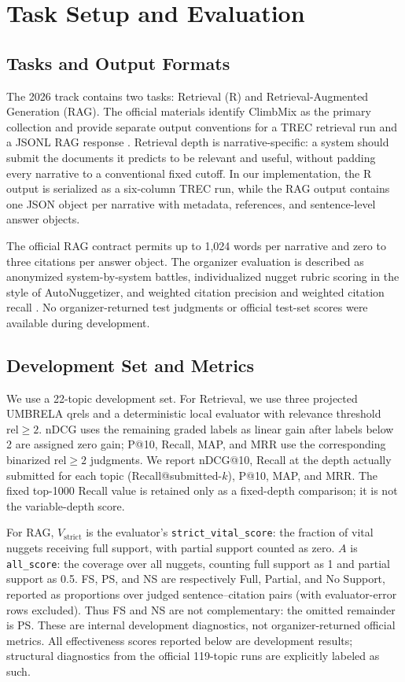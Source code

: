 \section{Task Setup and Evaluation}

\subsection{Tasks and Output Formats}

The 2026 track contains two tasks: Retrieval (R) and Retrieval-Augmented Generation (RAG). The official materials identify ClimbMix as the primary collection and provide separate output conventions for a TREC retrieval run and a JSONL RAG response \citep{trec_rag_website_2026,trec_rag_2026_guidelines}. Retrieval depth is narrative-specific: a system should submit the documents it predicts to be relevant and useful, without padding every narrative to a conventional fixed cutoff. In our implementation, the R output is serialized as a six-column TREC run, while the RAG output contains one JSON object per narrative with metadata, references, and sentence-level answer objects.

The official RAG contract permits up to 1,024 words per narrative and zero to three citations per answer object. The organizer evaluation is described as anonymized system-by-system battles, individualized nugget rubric scoring in the style of AutoNuggetizer, and weighted citation precision and weighted citation recall \citep{trec_rag_2026_guidelines}. No organizer-returned test judgments or official test-set scores were available during development.

\subsection{Development Set and Metrics}

We use a 22-topic development set. For Retrieval, we use three projected UMBRELA qrels \citep{upadhyay2024umbrela} and a deterministic local evaluator with relevance threshold $\mathrm{rel}\geq 2$. nDCG uses the remaining graded labels as linear gain after labels below 2 are assigned zero gain; P@10, Recall, MAP, and MRR use the corresponding binarized $\mathrm{rel}\geq 2$ judgments. We report nDCG@10, Recall at the depth actually submitted for each topic (Recall@submitted-$k$), P@10, MAP, and MRR. The fixed top-1000 Recall value is retained only as a fixed-depth comparison; it is not the variable-depth score.

For RAG, $V_{\mathrm{strict}}$ is the evaluator's \texttt{strict\_vital\_score}: the fraction of vital nuggets receiving full support, with partial support counted as zero. $A$ is \texttt{all\_score}: the coverage over all nuggets, counting full support as 1 and partial support as 0.5. FS, PS, and NS are respectively Full, Partial, and No Support, reported as proportions over judged sentence--citation pairs (with evaluator-error rows excluded). Thus FS and NS are not complementary: the omitted remainder is PS. These are internal development diagnostics, not organizer-returned official metrics. All effectiveness scores reported below are development results; structural diagnostics from the official 119-topic runs are explicitly labeled as such.

